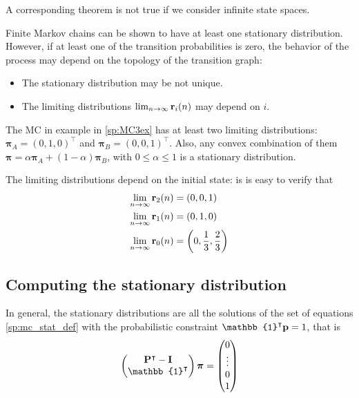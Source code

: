 A corresponding theorem is not true if we consider infinite state spaces.

Finite Markov chains can be shown to have at least one stationary distribution. However, if at least one of the transition probabilities is zero, the behavior of the process may depend on the topology of the transition graph:

\begin{itemize}
\item The stationary distribution may be not unique.
\item The limiting distributions $\lim_{n \rightarrow \infty} {\bf r}_i(n)$ may depend on $i$.
\end{itemize}

\begin{example}

The MC in example in \ref{sp:MC3ex} has at least two limiting distributions: $\bm{\pi}_A = (0, 1, 0)^\intercal$ and $\bm{\pi}_B = (0, 0, 1)^\intercal$. Also, any convex combination of them $\bm{\pi} = \alpha \bm{\pi}_A + (1-\alpha) \bm{\pi}_B$, with $0\le \alpha \le 1$ is a stationary distribution. 

The limiting distributions depend on the initial state: is is easy to verify that 
\begin{align}
\lim_{n \rightarrow \infty} {\bf r}_2(n) &= (0, 0, 1)  \\
\lim_{n \rightarrow \infty} {\bf r}_1(n) &= (0, 1, 0)  \\
\lim_{n \rightarrow \infty} {\bf r}_0(n) &= \left(0, \frac13, \frac23 \right)
\end{align}

\end{example}

\subsection{Computing the stationary distribution}

In general, the stationary distributions are all the solutions of the set of equations \eqref{sp:mc_stat_def} with the probabilistic constraint $\mathbb{1}^\intercal {\bf p} =1$, that is
\begin{align}
\label{sp:mc_stat_eq}
\begin{pmatrix}
{\bf P}^\intercal - {\bf I}  \\
\mathbb{1}^\intercal   
\end{pmatrix}
\bm{\pi} = 
\begin{pmatrix}
0 \\ \vdots \\ 0 \\ 1
\end{pmatrix}
\end{align}

